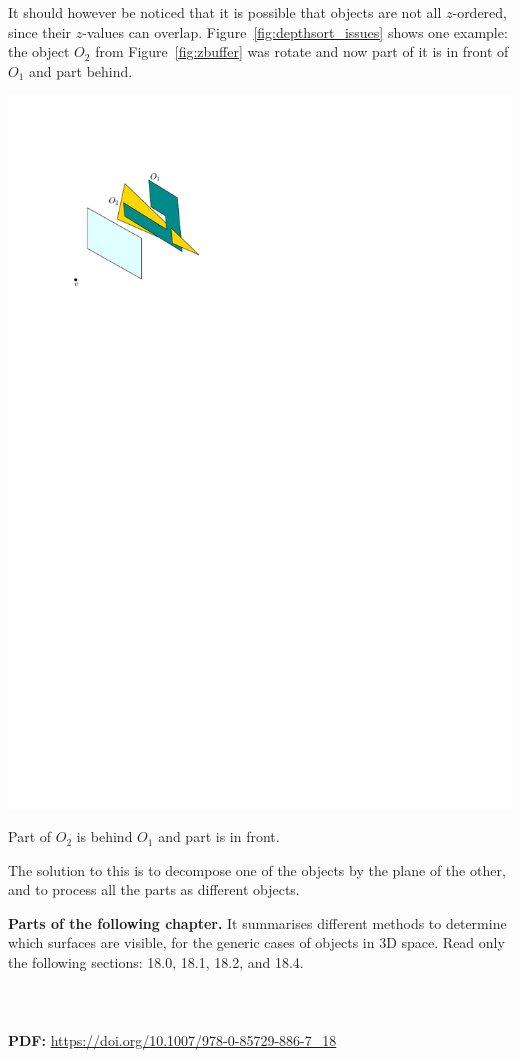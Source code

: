 It should however be noticed that it is possible that objects are not all $z$-ordered, since their $z$-values can overlap.
Figure~\ref{fig:depthsort_issues} shows one example: the object $O_2$ from Figure~\ref{fig:zbuffer} was rotate and now part of it is in front of $O_1$ and part behind.
\begin{marginfigure}
  \centering
  \includegraphics[width=\linewidth]{depthsort_issues.pdf}
  \caption{Part of $O_2$ is behind $O_1$ and part is in front.}%
\label{fig:depthsort_issues}
\end{marginfigure}
The solution to this is to decompose one of the objects by the plane of the other, and to process all the parts as different objects.


\begin{floatbox}
  \begin{kaobox-toread}[frametitle=\faExternalLink\ To read or to watch]
    \textbf{Parts of the following chapter.} It summarises different methods to determine which surfaces are visible, for the generic cases of objects in 3D space.
    Read only the following sections: 18.0, 18.1, 18.2, and 18.4.
    \\ \\
     \\ \\
    \textbf{PDF:} \url{https://doi.org/10.1007/978-0-85729-886-7_18}
  \end{kaobox-toread}
\end{floatbox}





